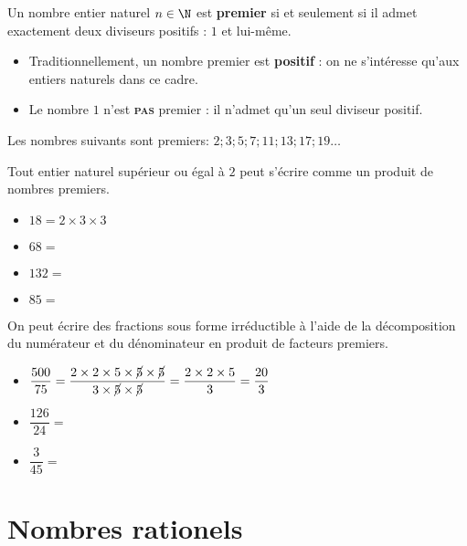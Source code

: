 \documentclass{article}
\begin{document}
\newpage
\begin{tcolorbox}
\begin{definition}
Un nombre entier naturel $n \in \N$ est \textbf{premier} si et seulement si il admet exactement deux diviseurs positifs : $1$ et lui-même. 
\end{definition}
\end{tcolorbox}
\begin{remark}
\hfill
\begin{itemize}
\item Traditionnellement, un nombre premier est \textbf{positif} : on ne s'intéresse qu'aux entiers naturels dans ce cadre.
\item Le nombre $1$ n'est \textbf{\textsc{pas}} premier : il n'admet qu'un seul diviseur positif. 
\end{itemize}
\end{remark}
\begin{example}
Les nombres suivants sont premiers: $2; 3; 5; 7; 11; 13; 17; 19 \dots$
\end{example}
\begin{proposition}
Tout entier naturel supérieur ou égal à $2$ peut s'écrire comme un produit de nombres premiers. 
\end{proposition}
\begin{example}
\hfill
\begin{itemize}
\item $18 = 2 \times 3 \times 3$
\item $68 =$ \answersline 
\item $132 =$ \answersline
\item $85 =$ \answersline
\end{itemize}
\end{example}
\begin{example}
On peut écrire des fractions sous forme irréductible à l'aide de la décomposition du numérateur et du dénominateur en produit de facteurs premiers.
\begin{itemize}
\item $\dfrac{500}{75} = \dfrac{2 \times 2 \times 5 \times \cancel{5} \times \cancel{5}}{3 \times \cancel{5} \times \cancel{5}} = \dfrac{2 \times 2 \times 5}{3} = \dfrac{20}{3}$
\item $\dfrac{126}{24} =$ \answersline
\item $\dfrac{3}{45} =$ \answersline
\end{itemize}
\end{example}

\newpage
\section{Nombres rationels}
\end{document}
